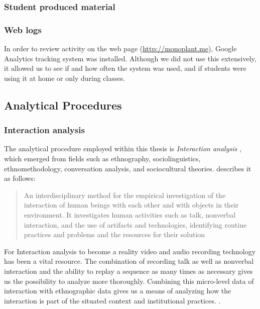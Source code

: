 \subsubsection{Student produced material}

\subsubsection{Web logs}
In order to review activity on the web page (\url{http://monoplant.me}), Google Analytics tracking system was installed. Although we did not use this extensively, it allowed us to see if and how often the system was used, and if students were using it at home or only during classes. 

\subsection{Analytical Procedures}
\subsubsection{Interaction analysis}
The analytical procedure employed within this thesis is \emph{Interaction analysis} \citep{jordan1995interaction}, which emerged from fields such as ethnography, sociolinguistics, ethnomethodology, conversation analysis, and sociocultural theories. \citeauthor{jordan1995interaction} describes it as follows:

\begin{quote}
An interdisciplinary method for the empirical investigation of the interaction of human
beings with each other and with objects in their environment. It investigates human
activities such as talk, nonverbal interaction, and the use of artifacts and technologies,
identifying routine practices and problems and the resources for their solution \citep[p39]{jordan1995interaction}
\end{quote}

For Interaction analysis to become a reality video and audio recording technology has been a vital resource. The combination of recording talk as well as nonverbal interaction and the ability to replay a sequence as many times as necessary gives us the possibility to analyze more thoroughly. Combining this micro-level data of interaction with ethnographic data gives us a means of analyzing how the interaction is part of the situated context and institutional practices. \citep{furberg2009scientific}. 

